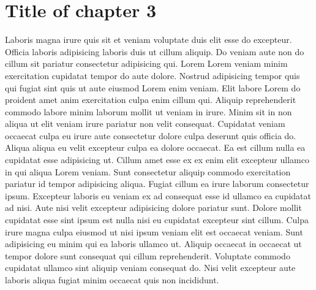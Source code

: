 \chapter{Title of chapter 3}

Laboris magna irure quis sit et veniam voluptate duis elit esse do excepteur. Officia laboris adipisicing laboris duis ut cillum aliquip. Do veniam aute non do cillum sit pariatur consectetur adipisicing qui. Lorem Lorem veniam minim exercitation cupidatat tempor do aute dolore. Nostrud adipisicing tempor quis qui fugiat sint quis ut aute eiusmod Lorem enim veniam. Elit labore Lorem do proident amet anim exercitation culpa enim cillum qui. Aliquip reprehenderit commodo labore minim laborum mollit ut veniam in irure. Minim sit in non aliqua ut elit veniam irure pariatur non velit consequat. Cupidatat veniam occaecat culpa eu irure aute consectetur dolore culpa deserunt quis officia do. Aliqua aliqua eu velit excepteur culpa ea dolore occaecat. Ea est cillum nulla ea cupidatat esse adipisicing ut. Cillum amet esse ex ex enim elit excepteur ullamco in qui aliqua Lorem veniam. Sunt consectetur aliquip commodo exercitation pariatur id tempor adipisicing aliqua. Fugiat cillum ea irure laborum consectetur ipsum. Excepteur laboris eu veniam ex ad consequat esse id ullamco ea cupidatat ad nisi. Aute nisi velit excepteur adipisicing dolore pariatur sunt. Dolore mollit cupidatat esse sint ipsum est nulla nisi eu cupidatat excepteur sint cillum. Culpa irure magna culpa eiusmod ut nisi ipsum veniam elit est occaecat veniam. Sunt adipisicing eu minim qui ea laboris ullamco ut. Aliquip occaecat in occaecat ut tempor dolore sunt consequat qui cillum reprehenderit. Voluptate commodo cupidatat ullamco sint aliquip veniam consequat do. Nisi velit excepteur aute laboris aliqua fugiat minim occaecat quis non incididunt.
